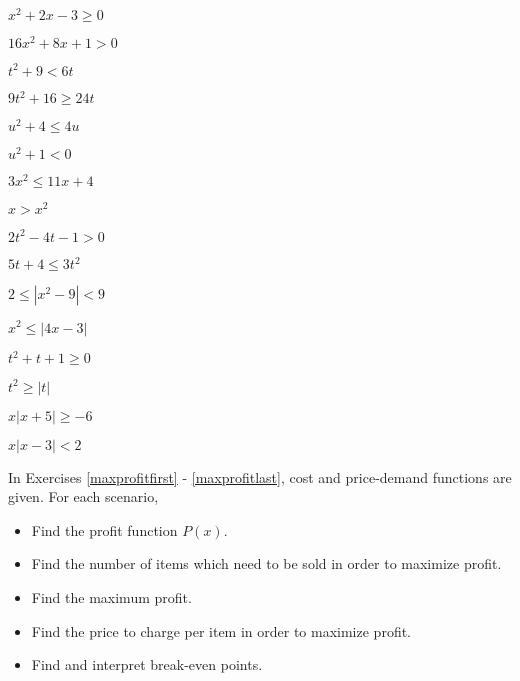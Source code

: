 \begin{shortexenum}
\item $x^{2} + 2x - 3 \geq 0$  \label{solveineququadfirsta}
\item  $16x^2+8x+1 > 0$
\item  $t^2+9 < 6t$
\item  $9t^2 + 16 \geq 24t$
\item  $u^2+4 \leq 4u$
\item $u^{2} + 1 < 0$
\item $3x^{2} \leq 11x + 4$
\item $x > x^{2}$
\item  $2t^2-4t-1 > 0$
\item  $5t+4 \leq 3t^2$
\item $2 \leq |x^{2} - 9| < 9$
\item $x^{2} \leq |4x - 3|$
\item $t^{2} + t + 1 \geq 0$
\item  $t^2 \geq |t|$ 
\item  $x |x+5| \geq -6$  
\item  $x |x-3| < 2$   \label{solveineququadlasta}
\end{shortexenum}

In Exercises \ref{maxprofitfirst} - \ref{maxprofitlast}, cost and price-demand functions are given.  For each scenario,

\begin{itemize}

\item  Find the profit function $P(x)$.

\item  Find the number of items which need to be sold in order to maximize profit.

\item  Find the maximum profit.

\item  Find the price to charge per item in order to maximize profit.

\item  Find and interpret break-even points.

\end{itemize}

